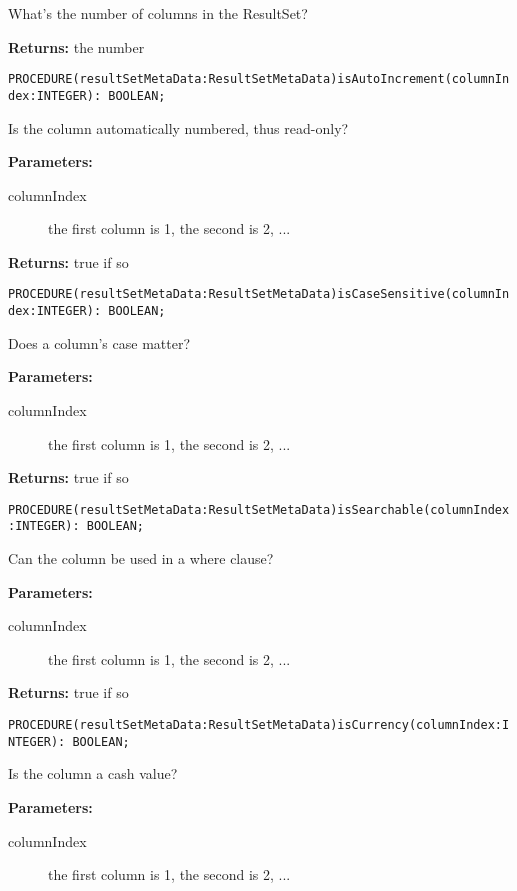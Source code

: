 What's the number of columns in the ResultSet? 

{\bf Returns: } 
the number 



\verb'PROCEDURE(resultSetMetaData:ResultSetMetaData)isAutoIncrement(columnIndex:INTEGER): BOOLEAN;'

Is the column automatically numbered, thus read-only? 

{\bf Parameters: }
\begin{description}
\item[columnIndex] the first column is 1, the second is 2, ... 
\end{description}

{\bf Returns: } 
true if so 



\verb'PROCEDURE(resultSetMetaData:ResultSetMetaData)isCaseSensitive(columnIndex:INTEGER): BOOLEAN;'

Does a column's case matter? 

{\bf Parameters: }
\begin{description}
\item[columnIndex] the first column is 1, the second is 2, ... 
\end{description}

{\bf Returns: } 
true if so 



\verb'PROCEDURE(resultSetMetaData:ResultSetMetaData)isSearchable(columnIndex:INTEGER): BOOLEAN;'

Can the column be used in a where clause? 

{\bf Parameters: }
\begin{description}
\item[columnIndex] the first column is 1, the second is 2, ... 
\end{description}

{\bf Returns: } 
true if so 



\verb'PROCEDURE(resultSetMetaData:ResultSetMetaData)isCurrency(columnIndex:INTEGER): BOOLEAN;'

Is the column a cash value? 

{\bf Parameters: }
\begin{description}
\item[columnIndex] the first column is 1, the second is 2, ... 
\end{description}


